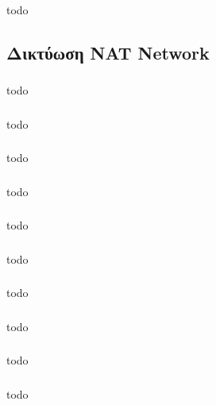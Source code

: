 \documentclass[a4paper, 12pt]{article}
\begin{document}
		\subsubsection{}
			todo

	\subsection{Δικτύωση NAT Network}

		\subsubsection{}
			todo

		\subsubsection{}
			todo

		\subsubsection{}
			todo

		\subsubsection{}
			todo

		\subsubsection{}
			todo

		\subsubsection{}
			todo

		\subsubsection{}
			todo
		
		\subsubsection{}
			todo

		\subsubsection{}
			todo

		\subsubsection{}
			todo
\end{document}
